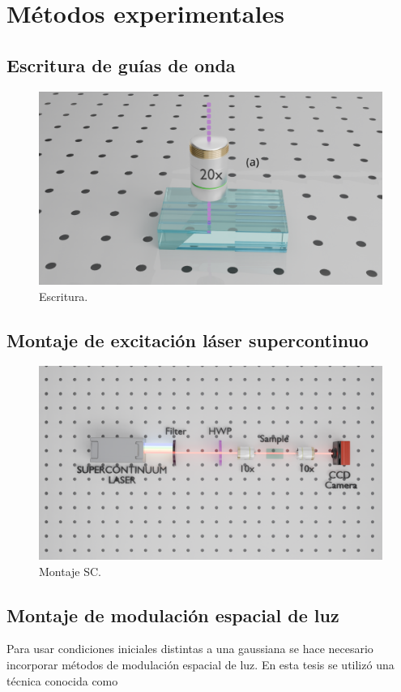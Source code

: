\chapter{Métodos experimentales}

\section{Escritura de guías de onda}
\begin{figure}[H]
	\centering
	\includegraphics[width=0.6\linewidth, trim={18cm 4cm 15cm 6cm},clip]{media/fabrication}
	\caption{Escritura.}
\end{figure}

\section{Montaje de excitación láser supercontinuo}
\begin{figure}[H]
	\centering
	\includegraphics[width=\linewidth, trim={5cm 9cm 3cm 7cm},clip]{media/SC_setup}
	\caption{Montaje SC.}
\end{figure}
\newpage
\section{Montaje de modulación espacial de luz}

Para usar condiciones iniciales distintas a una gaussiana se hace necesario incorporar métodos de modulación espacial de luz. En esta tesis se utilizó una técnica conocida como 

